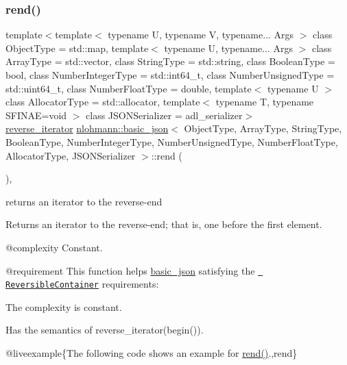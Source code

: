 \subsubsection{\texorpdfstring{rend()}{rend()}\hspace{0.1cm}{\footnotesize\ttfamily [1/2]}}
{\footnotesize\ttfamily template$<$template$<$ typename U, typename V, typename... Args $>$ class Object\+Type = std\+::map, template$<$ typename U, typename... Args $>$ class Array\+Type = std\+::vector, class String\+Type  = std\+::string, class Boolean\+Type  = bool, class Number\+Integer\+Type  = std\+::int64\+\_\+t, class Number\+Unsigned\+Type  = std\+::uint64\+\_\+t, class Number\+Float\+Type  = double, template$<$ typename U $>$ class Allocator\+Type = std\+::allocator, template$<$ typename T, typename S\+F\+I\+N\+A\+E=void $>$ class J\+S\+O\+N\+Serializer = adl\+\_\+serializer$>$ \\
\mbox{\hyperlink{classnlohmann_1_1basic__json_ac223d5560c2b05a208c88de67376c5f2}{reverse\+\_\+iterator}} \mbox{\hyperlink{classnlohmann_1_1basic__json}{nlohmann\+::basic\+\_\+json}}$<$ Object\+Type, Array\+Type, String\+Type, Boolean\+Type, Number\+Integer\+Type, Number\+Unsigned\+Type, Number\+Float\+Type, Allocator\+Type, J\+S\+O\+N\+Serializer $>$\+::rend (\begin{DoxyParamCaption}{ }\end{DoxyParamCaption})\hspace{0.3cm}{\ttfamily [inline]}, {\ttfamily [noexcept]}}



returns an iterator to the reverse-\/end 

Returns an iterator to the reverse-\/end; that is, one before the first element.

 @complexity Constant.

@requirement This function helps {\ttfamily \mbox{\hyperlink{classnlohmann_1_1basic__json}{basic\+\_\+json}}} satisfying the \href{http://en.cppreference.com/w/cpp/concept/ReversibleContainer}{\texttt{ Reversible\+Container}} requirements\+:
\begin{DoxyItemize}
\item The complexity is constant.
\item Has the semantics of {\ttfamily reverse\+\_\+iterator(begin())}.
\end{DoxyItemize}

@liveexample\{The following code shows an example for {\ttfamily \mbox{\hyperlink{classnlohmann_1_1basic__json_ac77aed0925d447744676725ab0b6d535}{rend()}}}.,rend\}


